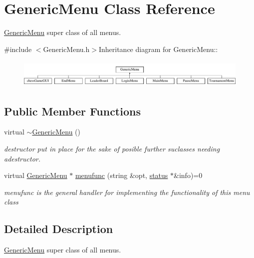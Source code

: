 \hypertarget{classGenericMenu}{
\section{GenericMenu Class Reference}
\label{classGenericMenu}
}


\hyperlink{classGenericMenu}{GenericMenu} super class of all menus.  


{\ttfamily \#include $<$GenericMenu.h$>$}Inheritance diagram for GenericMenu::\begin{figure}[H]
\begin{center}
\leavevmode
\includegraphics[height=1.35593cm]{classGenericMenu}
\end{center}
\end{figure}
\subsection*{Public Member Functions}
\begin{DoxyCompactItemize}
\item 
\hypertarget{classGenericMenu_ab0abde37b50eb17890bd223cc4807638}{
virtual \hyperlink{classGenericMenu_ab0abde37b50eb17890bd223cc4807638}{$\sim$GenericMenu} ()}
\label{classGenericMenu_ab0abde37b50eb17890bd223cc4807638}

\begin{DoxyCompactList}\small\item\em destructor put in place for the sake of posible further suclasses needing adestructor. \item\end{DoxyCompactList}\item 
virtual \hyperlink{classGenericMenu}{GenericMenu} $\ast$ \hyperlink{classGenericMenu_a290ad7ec3331edc968190b1d7b48a397}{menufunc} (string \&opt, \hyperlink{classstatus}{status} $\ast$\&info)=0
\begin{DoxyCompactList}\small\item\em menufunc is the general handler for implementing the functionality of this menu class \item\end{DoxyCompactList}\end{DoxyCompactItemize}


\subsection{Detailed Description}
\hyperlink{classGenericMenu}{GenericMenu} super class of all menus. 

